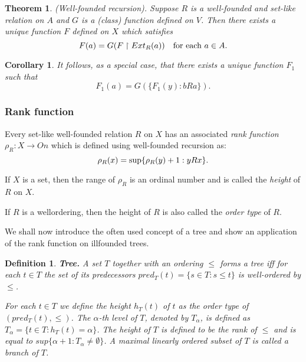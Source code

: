 \documentclass[a4paper,11pt,oneside]{mybook}
\theoremstyle{theorem}
\newtheorem{theorem}[subsection]{Theorem}
\newtheorem{corollary}[subsection]{Corollary}
\newtheorem{definition}[subsection]{Definition}
\theoremstyle{example}
\begin{document}
{\begin{theorem}\label{WF-recursion}
{\rm (Well-founded recursion).} Suppose $R$ is a well-founded and set-like
relation on $A$ and $G$ is a (class) function defined on $V$.
Then there exists a unique function $F$ defined on $X$ which satisfies
$$ %
 F(a) = G(F\upharpoonright Ext_R(a) )\quad\hbox{for each}\ a\in A.
$$ %
\end{theorem}

\begin{corollary}
It follows, as a special case, that there exists a unique function $F_1$ such that
 $$ %
 F_1(a) = G(\{F_1(y):b R a \}).
$$ %
\end{corollary}

\subsubsection{Rank function}
Every set-like well-founded relation $R$ on $X$ has an associated \emph{rank function} $\rho_R:X\to On$ which
is defined using well-founded recursion as:
$$ %
 \rho_R(x)=\hbox{sup}\{\rho_R(y)+1:y R x\}.
$$ %

\smallskip

If $X$ is a set, then the range of $\rho_R$ is an ordinal number and is called the \emph{height} of $R$ on $X$.

\smallskip

If $R$ is a wellordering, then the height of $R$ is also called the \emph{order type} of $R$.

\smallskip

We shall now introduce the often used concept of a tree and show an application of the rank function on illfounded trees.


\begin{definition}\label{tree}
{\bf Tree.} A set $T$ together with an ordering $\leq$ forms a \emph{tree} iff
for each $t\in T$ the set of its predecessors $pred_T(t)=\{s\in T:s\leq t\}$ is well-ordered by $\leq$.

\smallskip

For each $t\in T$ we define the \emph{height} $h_T(t)$ of $t$ as the order type of
$(pred_T(t),\leq)$. The $\alpha$-th level of $T$, denoted by $T_\alpha$,  is defined as $T_\alpha=\{t\in T:h_T(t)=\alpha\}$. The height of $T$ is defined to be
the rank of $\leq$ and is equal to $sup\{\alpha+1:T_\alpha\neq\emptyset\}$. A maximal linearly ordered subset of $T$ is called a \emph{branch} of $T$.


\end{definition}}
\end{document}
